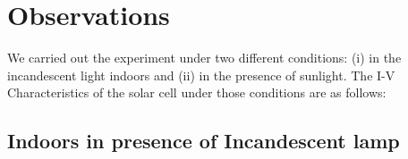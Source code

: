 \section{Observations}
	We carried out the experiment under two different conditions: (i) in the incandescent light indoors and (ii) in the presence of sunlight. The I-V Characteristics of the solar cell under those conditions are as follows:
	\subsection{Indoors in presence of Incandescent lamp}
		